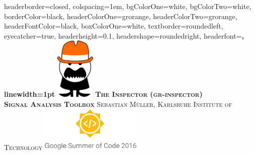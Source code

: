 \documentclass[a0paper,fontscale=0.35]{baposter} %
\begin{document}
\begin{poster}
{
headerborder=closed, %
colspacing=1em, %
bgColorOne=white, %
bgColorTwo=white, %
borderColor=black, %
headerColorOne=grorange, %
headerColorTwo=grorange, %
headerFontColor=black, %
boxColorOne=white, %
textborder=roundedleft, %
eyecatcher=true, %
headerheight=0.1\textheight, %
headershape=roundedright, %
headerfont=\Large\bf\textsc, %
linewidth=1pt %
}
%
{\includegraphics[height=8em]{logo_body}} %
{\bf\textsc{The Inspector (gr-inspector)\\ \Large{Signal Analysis Toolbox}}\vspace{0.5em}} %
{\textsc{Sebastian Müller, Karlsruhe Institute of Technology}} %
{\includegraphics[width=13em]{gsoc}} %



\end{poster}
\end{document}
